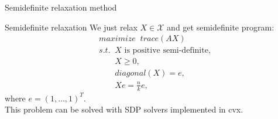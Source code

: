 \documentclass{beamer}
\theoremstyle{definition}
\theoremstyle{plain}
\theoremstyle{remark}
\begin{document}
			\begin{frame}{Semidefinite relaxation method}
				\begin{block}{Semidefinite relaxation}
				We just relax $X \in \mathcal{X}$ and get semidefinite program:
				\begin{equation}
					\begin{aligned}
						&maximize\;\;trace(AX)\\
						&s.t. \;\;X \text{ is positive semi-definite}, \\
						&\;\;\;\;\;\;\; X \geq 0, \\
						&\;\;\;\;\;\;\; diagonal(X) = e, \\
						&\;\;\;\;\;\;\; Xe = \frac{n}{k}e,
					\nonumber
					\end{aligned}
				\end{equation}
				where $e = (1,\ldots,1)^T$.\\
				\vspace{5pt}
				This problem can be solved with SDP solvers implemented in cvx.
				\end{block}
			\end{frame}
\end{document}

